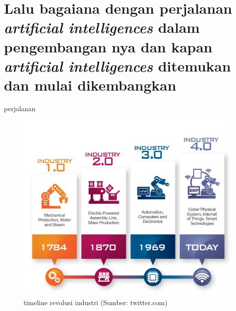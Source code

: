 \section{Lalu bagaiana dengan perjalanan \textit{artificial intelligences} dalam pengembangan nya dan kapan \textit{artificial intelligences} ditemukan dan mulai dikembangkan} 
perjalanan
\begin{figure} [ht] \centering
  \includegraphics[scale=0.4]{gambar/timeline.jpg}
  \caption{timeline revolusi industri (Sumber: twitter.com)}
  \label{fig:artificial intelligences}
\end{figure}

